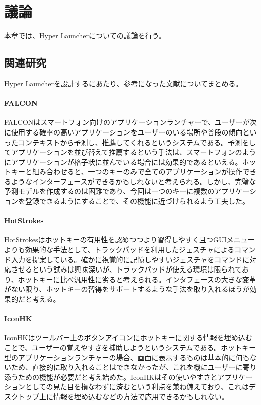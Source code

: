 \chapter{議論}
本章では、Hyper Launcherについての議論を行う。

\newpage

\section{関連研究}
Hyper Launcherを設計するにあたり、参考になった文献についてまとめる。

\subsubsection{FALCON}
FALCON\cite{falcon}はスマートフォン向けのアプリケーションランチャーで、ユーザーが次に使用する確率の高いアプリケーションをユーザーのいる場所や普段の傾向といったコンテキストから予測し、推薦してくれるというシステムである。予測をしてアプリケーションを並び替えて推薦するという手法は、スマートフォンのようにアプリケーションが格子状に並んでいる場合には効果的であるといえる。ホットキーと組み合わせると、一つのキーのみで全てのアプリケーションが操作できるようなインターフェースができるかもしれないと考えられる。しかし、完璧な予測モデルを作成するのは困難であり、今回は一つのキーに複数のアプリケーションを登録できるようにすることで、その機能に近づけられるよう工夫した。

\subsubsection{HotStrokes}
HotStrokes\cite{hotstrokes}はホットキーの有用性を認めつつより習得しやすく且つGUIメニューよりも効果的な手法として、トラックパッドを利用したジェスチャによるコマンド入力を提案している。確かに視覚的に記憶しやすいジェスチャをコマンドに対応させるという試みは興味深いが、トラックパッドが使える環境は限られており、ホットキーに比べ汎用性に劣ると考えられる。インタフェースの大きな変革がない限り、ホットキーの習得をサポートするような手法を取り入れるほうが効果的だと考える。

\subsubsection{IconHK}
IconHK\cite{iconhk}はツールバー上のボタンアイコンにホットキーに関する情報を埋め込むことで、ユーザーの覚えやすさを補助しようというシステムである。ホットキー型のアプリケーションランチャーの場合、画面に表示するものは基本的に何もないため、直接的に取り入れることはできなかったが、これを機にユーザーに寄り添うための機能が必要だと考え始めた。IconHKはその使いやすさとアプリケーションとしての見た目を損なわずに済むという利点を兼ね備えており、これはデスクトップ上に情報を埋め込むなどの方法で応用できるかもしれない。


